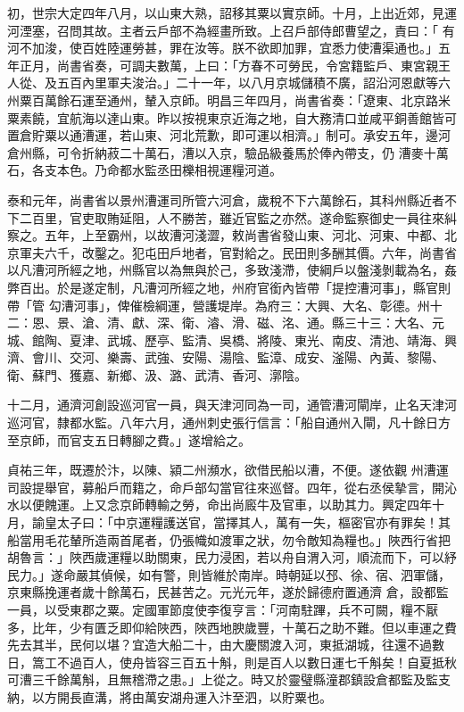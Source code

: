 \begin{pinyinscope}
 初，世宗大定四年八月，以山東大熟，詔移其粟以實京師。十月，上出近郊，見運河湮塞，召問其故。主者云戶部不為經畫所致。上召戶部侍郎曹望之，責曰：「
 有河不加浚，使百姓陸運勞甚，罪在汝等。朕不欲即加罪，宜悉力使漕渠通也。」五年正月，尚書省奏，可調夫數萬，上曰：「方春不可勞民，令宮籍監戶、東宮親王人從、及五百內里軍夫浚治。」二十一年，以八月京城儲積不廣，詔沿河恩獻等六州粟百萬餘石運至通州，輦入京師。明昌三年四月，尚書省奏：「遼東、北京路米粟素饒，宜航海以達山東。昨以按視東京近海之地，自大務清口並咸平銅善館皆可置倉貯粟以通漕運，若山東、河北荒歉，即可運以相濟。」制可。承安五年，邊河倉州縣，可令折納菽二十萬石，漕以入京，驗品級養馬於俸內帶支，仍
 漕麥十萬石，各支本色。乃命都水監丞田櫟相視運糧河道。



 泰和元年，尚書省以景州漕運司所管六河倉，歲稅不下六萬餘石，其科州縣近者不下二百里，官吏取賄延阻，人不勝苦，雖近官監之亦然。遂命監察御史一員往來糾察之。五年，上至霸州，以故漕河淺澀，敕尚書省發山東、河北、河東、中都、北京軍夫六千，改鑿之。犯屯田戶地者，官對給之。民田則多酬其價。六年，尚書省以凡漕河所經之地，州縣官以為無與於己，多致淺滯，使綱戶以盤淺剝載為名，姦弊百出。於是遂定制，凡漕河所經之地，州府官銜內皆帶「提控漕河事」，縣官則帶「管
 勾漕河事」，俾催檢綱運，營護堤岸。為府三：大興、大名、彰德。州十二：恩、景、滄、清、獻、深、衛、濬、滑、磁、洺、通。縣三十三：大名、元城、館陶、夏津、武城、歷亭、監清、吳橋、將陵、東光、南皮、清池、靖海、興濟、會川、交河、樂壽、武強、安陽、湯陰、監漳、成安、滏陽、內黃、黎陽、衛、蘇門、獲嘉、新鄉、汲、潞、武清、香河、漷陰。



 十二月，通濟河創設巡河官一員，與天津河同為一司，通管漕河閘岸，止名天津河巡河官，隸都水監。八年六月，通州刺史張行信言：「船自通州入閘，凡十餘日方至京師，而官支五日轉腳之費。」遂增給之。



 貞祐三年，既遷於汴，以陳、潁二州瀕水，欲借民船以漕，不便。遂依觀
 州漕運司設提舉官，募船戶而籍之，命戶部勾當官往來巡督。四年，從右丞侯摯言，開沁水以便餽運。上又念京師轉輸之勞，命出尚廄牛及官車，以助其力。興定四年十月，諭皇太子曰：「中京運糧護送官，當擇其人，萬有一失，樞密官亦有罪矣！其船當用毛花輦所造兩首尾者，仍張幟如渡軍之狀，勿令敵知為糧也。」陜西行省把胡魯言：」陜西歲運糧以助關東，民力浸困，若以舟自渭入河，順流而下，可以紓民力。」遂命嚴其偵候，如有警，則皆維於南岸。時朝延以邳、徐、宿、泗軍儲，京東縣挽運者歲十餘萬石，民甚苦之。元光元年，遂於歸德府置通濟
 倉，設都監一員，以受東郡之粟。定國軍節度使李復亨言：「河南駐蹕，兵不可闕，糧不厭多，比年，少有匱乏即仰給陜西，陜西地腴歲豐，十萬石之助不難。但以車運之費先去其半，民何以堪？宜造大船二十，由大慶關渡入河，東抵湖城，往還不過數日，篙工不過百人，使舟皆容三百五十斛，則是百人以數日運七千斛矣！自夏抵秋可漕三千餘萬斛，且無稽滯之患。」上從之。時又於靈璧縣潼郡鎮設倉都監及監支納，以方開長直溝，將由萬安湖舟運入汴至泗，以貯粟也。




\end{pinyinscope}
